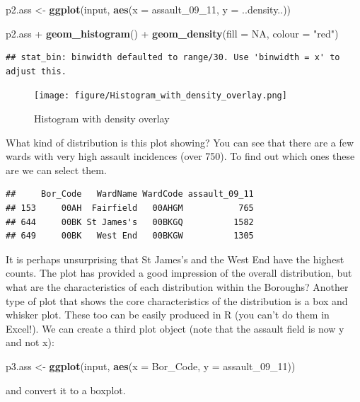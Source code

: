 \documentclass[]{article}
\newenvironment{Shaded}{}{}
\newcommand{\KeywordTok}[1]{\textcolor[rgb]{0.00,0.44,0.13}{\textbf{{#1}}}}
\newcommand{\DataTypeTok}[1]{\textcolor[rgb]{0.56,0.13,0.00}{{#1}}}
\newcommand{\DecValTok}[1]{\textcolor[rgb]{0.25,0.63,0.44}{{#1}}}
\newcommand{\StringTok}[1]{\textcolor[rgb]{0.25,0.44,0.63}{{#1}}}
\newcommand{\OtherTok}[1]{\textcolor[rgb]{0.00,0.44,0.13}{{#1}}}
\newcommand{\NormalTok}[1]{{#1}}
\begin{document}
\begin{Shaded}
\begin{Highlighting}[]
\NormalTok{p2.ass <- }\KeywordTok{ggplot}\NormalTok{(input, }\KeywordTok{aes}\NormalTok{(}\DataTypeTok{x =} \NormalTok{assault_09_11, }\DataTypeTok{y =} \NormalTok{..density..))}

\NormalTok{p2.ass + }\KeywordTok{geom_histogram}\NormalTok{() + }\KeywordTok{geom_density}\NormalTok{(}\DataTypeTok{fill =} \OtherTok{NA}\NormalTok{, }\DataTypeTok{colour =} \StringTok{"red"}\NormalTok{)}
\end{Highlighting}
\end{Shaded}
\begin{verbatim}
## stat_bin: binwidth defaulted to range/30. Use 'binwidth = x' to adjust this.
\end{verbatim}
\begin{figure}[htbp]
\centering
\texttt{[image: figure/Histogram\_with\_density\_overlay.png]}
\caption{Histogram with density overlay}
\end{figure}

What kind of distribution is this plot showing? You can see that there
are a few wards with very high assault incidences (over 750). To find
out which ones these are we can select them.

\begin{Shaded}
\end{Shaded}
\begin{verbatim}
##     Bor_Code   WardName WardCode assault_09_11
## 153     00AH  Fairfield   00AHGM           765
## 644     00BK St James's   00BKGQ          1582
## 649     00BK   West End   00BKGW          1305
\end{verbatim}
It is perhaps unsurprising that St James's and the West End have the
highest counts. The plot has provided a good impression of the overall
distribution, but what are the characteristics of each distribution
within the Boroughs? Another type of plot that shows the core
characteristics of the distribution is a box and whisker plot. These too
can be easily produced in R (you can't do them in Excel!). We can create
a third plot object (note that the assault field is now y and not x):

\begin{Shaded}
\begin{Highlighting}[]
\NormalTok{p3.ass <- }\KeywordTok{ggplot}\NormalTok{(input, }\KeywordTok{aes}\NormalTok{(}\DataTypeTok{x =} \NormalTok{Bor_Code, }\DataTypeTok{y =} \NormalTok{assault_09_11))}
\end{Highlighting}
\end{Shaded}
and convert it to a boxplot.
\end{document}
